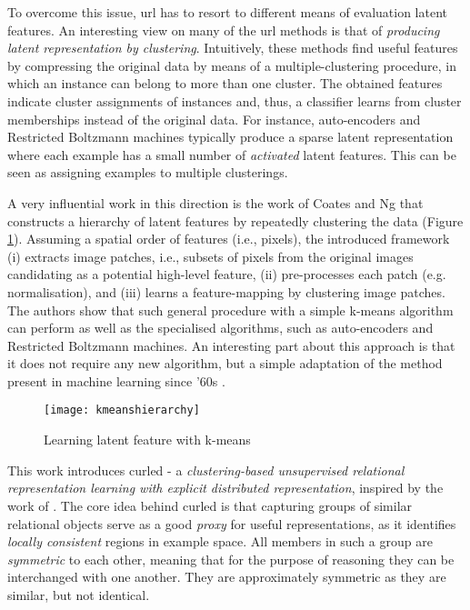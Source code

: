 To overcome this issue, \gls{url} has to resort to different means of evaluation latent features.
An interesting view on many of the \gls{url} methods is that of \textit{producing latent representation by clustering}.
Intuitively, these methods find useful features by compressing the original data by means of a  multiple-clustering procedure, in which an instance can belong to more than one cluster.
The obtained features indicate cluster assignments of instances and, thus, a classifier learns from cluster memberships instead of the original data.
For instance, auto-encoders and Restricted Boltzmann machines typically produce a sparse latent representation where each example has a small number of \textit{activated} latent features.
This can be seen as assigning examples to multiple clusterings. 


A very influential work in this direction is the work of Coates and Ng \cite{coates2011analysis} that constructs a hierarchy of latent features by repeatedly clustering the data  (Figure \ref{fig:kmeansh}).
Assuming a spatial order of features (i.e., pixels), the introduced framework (i) extracts image patches, i.e., subsets of pixels from the original images candidating as a potential high-level feature, (ii) pre-processes each patch (e.g. normalisation), and (iii) learns a feature-mapping by clustering image patches.
The authors show that such general procedure with a simple k-means algorithm can perform as well as the specialised algorithms, such as auto-encoders and  Restricted Boltzmann machines.
An interesting part about this approach is that it does not require any new algorithm, but a simple adaptation of the method present in machine learning since '60s \cite{kmeans}.





\begin{figure}
	\medskip
	\centering
	\texttt{[image: kmeanshierarchy]}
	\caption{Learning latent feature with k-means}
	\label{fig:kmeansh}
\end{figure}



This work introduces \gls{curled} - a \textit{clustering-based unsupervised relational representation learning with explicit distributed representation}, inspired by the work of \cite{coates2011analysis}.
The core idea behind \gls{curled} is that capturing groups of similar relational objects serve as a good \textit{proxy} for useful representations, as it identifies \textit{locally consistent} regions in example space.
All members in such a group are \textit{symmetric} to each other, meaning that for the purpose of reasoning they can be interchanged with one another.
They are approximately symmetric as they are similar, but not identical.




